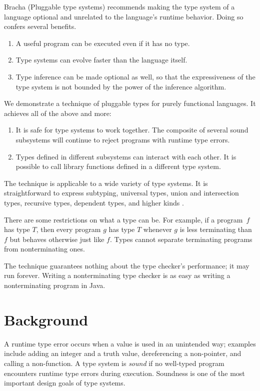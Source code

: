 \documentclass{amsart}
\def\thingsExpressibleInMpsModel{%
subtyping, universal types, union and intersection types,
recursive types, dependent types, and higher kinds%
}
\begin{document}
Bracha (Pluggable type systems) recommends making the type system
of a language optional and unrelated to the language's runtime
behavior. Doing so confers several benefits.
\begin{enumerate}
\item A useful program can be executed even if it has no type.
\item Type systems can evolve faster than the language itself.
\item Type inference can be made optional as well, so that the
expressiveness of the type system is not bounded by the power of
the inference algorithm.
\end{enumerate}
We demonstrate a technique of pluggable types for purely
functional languages. It achieves all of the above and more:
\begin{enumerate}\setcounter{enumi}3
\item It is safe for type systems to work together. The composite
of several sound subsystems will continue to reject programs with
runtime type errors.
\item Types defined in different subsystems can interact with
each other. It is possible to call library functions defined
in a different type system.
\end{enumerate}
The technique is applicable to a wide variety of type systems. It
is straightforward to express \thingsExpressibleInMpsModel.

There are some restrictions on what a type can be. For example,
if a program~$f$ has type $T$, then every program $g$ has type
$T$ whenever $g$ is less terminating than $f$ but behaves
otherwise just like $f$. Types cannot separate terminating
programs from nonterminating ones.

The technique guarantees nothing about the type checker's
performance; it may run forever. Writing a nonterminating type
checker is as easy as writing a nonterminating program in Java.

\section{Background}

A runtime type error occurs when a value is used in an unintended
way; examples include adding an integer and a truth value,
dereferencing a non-pointer, and calling a non-function. A type
system is \emph{sound} if no well-typed program encounters
runtime type errors during execution. Soundness is one of the
most important design goals of type systems.
\end{document}
